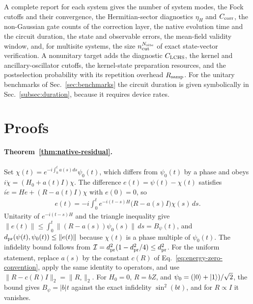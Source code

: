 \documentclass[pra,twocolumn,superscriptaddress,nofootinbib,floatfix]{revtex4-2}
\theoremstyle{remark}
\newcommand{\dpr}{d_{\rm pr}}
\begin{document}
A complete report for each system gives the number of system modes, the Fock cutoffs and their convergence, the Hermitian-sector diagnostics \(\eta_H\) and \(C_{\rm corr}\), the non-Gaussian gate counts of the correction layer, the native evolution time and the circuit duration, the state and observable errors, the mean-field validity window, and, for multisite systems, the size \(n_{\rm cut}^{N_{\rm site}}\) of exact state-vector verification. A nonunitary target adds the diagnostic \(C_{\rm LCHS}\), the kernel and ancillary-oscillator cutoffs, the kernel-state preparation resources, and the postselection probability with its repetition overhead \(R_{\rm samp}\). For the unitary benchmarks of Sec.~\ref{sec:benchmarks} the circuit duration is given symbolically in Sec.~\ref{subsec:duration}, because it requires device rates.

\section{Proofs}
\label{app:proofs}

\paragraph{Theorem~\ref{thm:native-residual}.}
Set \(\chi(t)=e^{-i\int_0^ta(s)ds}\psi_0(t)\), which differs from \(\psi_0(t)\) by a phase and obeys \(i\dot\chi=(H_0+a(t)I)\chi\). The difference \(e(t)=\psi(t)-\chi(t)\) satisfies \(i\dot e=He+(R-a(t)I)\chi\) with \(e(0)=0\), so
\begin{align}
e(t)=-i\int_0^te^{-i(t-s)H}\big(R-a(s)I\big)\chi(s)\,ds .
\end{align}
Unitarity of \(e^{-i(t-s)H}\) and the triangle inequality give \(\|e(t)\|\le\int_0^t\|(R-a(s))\psi_0(s)\|\,ds=B_\psi(t)\), and \(\dpr(\psi(t),\psi_0(t))\le\|e(t)\|\) because \(\chi(t)\) is a phase multiple of \(\psi_0(t)\). The infidelity bound follows from \(\mathcal I=\dpr^2(1-\dpr^2/4)\le\dpr^2\). For the uniform statement, replace \(a(s)\) by the constant \(c(R)\) of Eq.~\eqref{eq:energy-zero-convention}, apply the same identity to operators, and use \(\|R-c(R)I\|_2=\|R_\circ\|_2\). For \(H_0=0\), \(R=bZ\), and \(\psi_0=(\ket0+\ket1)/\sqrt2\), the bound gives \(B_\psi=|b|t\) against the exact infidelity \(\sin^2(bt)\), and for \(R\propto I\) it vanishes.
\end{document}
